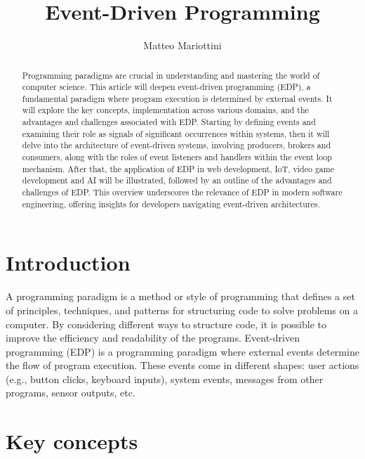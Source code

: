\documentclass[twocolumn]{article}
\title{Event-Driven Programming}
\author{Matteo Mariottini}
\date{}
\begin{document}
\maketitle

\begin{abstract}
          
Programming paradigms are crucial in understanding and mastering the world of computer science.  
This article will deepen event-driven programming (EDP), a fundamental paradigm where program execution is determined by external events.  
It will explore the key concepts, implementation across various domains, and the advantages and challenges associated with EDP.  
Starting by defining events and examining their role as signals of significant occurrences within systems, then it will delve into the architecture of event-driven systems, involving producers, brokers and consumers, along with the roles of event listeners and handlers within the event loop mechanism.  
After that, the application of EDP in web development, IoT, video game development and AI will be illustrated, followed by an outline of the advantages and challenges of EDP.  
This overview underscores the relevance of EDP in modern software engineering, offering insights for developers navigating event-driven architectures.

\end{abstract}

\section{Introduction}
\label{sec:introduction}
          
A programming paradigm is a method or style of programming that defines a set of principles, techniques, and patterns for structuring code to solve problems on a computer.
By considering different ways to structure code, it is possible to improve the efficiency and readability of the programs. \cite{studysmarterProgrammingParadigms}
Event-driven programming (EDP) is a programming paradigm where external events determine the flow of program execution.
These events come in different shapes: user actions (e.g., button clicks, keyboard inputs), system events, messages from other programs, sensor outputs, etc. \cite{quixWhatEventdriven}

\section{Key concepts}
\label{sec:keyConcepts}
\end{document}

